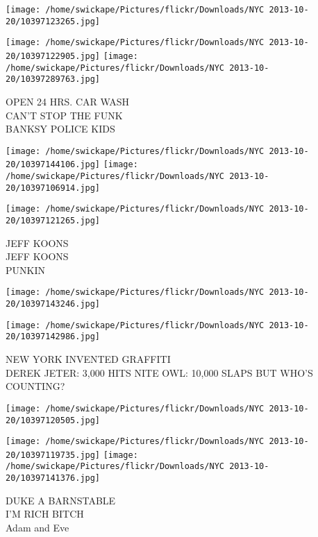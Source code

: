 \documentclass[10pt,letterpaper]{article}
\begin{document}
\texttt{[image: /home/swickape/Pictures/flickr/Downloads/NYC 2013-10-20/10397123265.jpg]}

\vspace{0.25in}
\texttt{[image: /home/swickape/Pictures/flickr/Downloads/NYC 2013-10-20/10397122905.jpg]}
\texttt{[image: /home/swickape/Pictures/flickr/Downloads/NYC 2013-10-20/10397289763.jpg]}

OPEN 24 HRS. CAR WASH\\
CAN'T STOP THE FUNK\\
BANKSY POLICE KIDS\\
\pagebreak

\texttt{[image: /home/swickape/Pictures/flickr/Downloads/NYC 2013-10-20/10397144106.jpg]}
\texttt{[image: /home/swickape/Pictures/flickr/Downloads/NYC 2013-10-20/10397106914.jpg]}

\vspace{0.25in}
\texttt{[image: /home/swickape/Pictures/flickr/Downloads/NYC 2013-10-20/10397121265.jpg]}

JEFF KOONS\\
JEFF KOONS\\
PUNKIN\\
\pagebreak

\texttt{[image: /home/swickape/Pictures/flickr/Downloads/NYC 2013-10-20/10397143246.jpg]}

\vspace{0.25in}
\texttt{[image: /home/swickape/Pictures/flickr/Downloads/NYC 2013-10-20/10397142986.jpg]}

NEW YORK INVENTED GRAFFITI\\
DEREK JETER: 3,000 HITS NITE OWL: 10,000 SLAPS BUT WHO'S COUNTING?\\
\pagebreak

\texttt{[image: /home/swickape/Pictures/flickr/Downloads/NYC 2013-10-20/10397120505.jpg]}

\vspace{0.25in}
\texttt{[image: /home/swickape/Pictures/flickr/Downloads/NYC 2013-10-20/10397119735.jpg]}
\texttt{[image: /home/swickape/Pictures/flickr/Downloads/NYC 2013-10-20/10397141376.jpg]}

DUKE A BARNSTABLE\\
I'M RICH BITCH\\
Adam and Eve\\
\pagebreak
\end{document}
